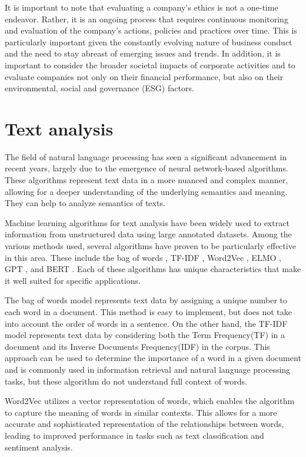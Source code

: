 \documentclass[PI]{ProjectProposal}
\begin{document}
It is important to note that evaluating a company's ethics is not a one-time endeavor. Rather, it is an ongoing process that requires continuous monitoring and evaluation of the company's actions, policies and practices over time. This is particularly important given the constantly evolving nature of business conduct and the need to stay abreast of emerging issues and trends. In addition, it is important to consider the broader societal impacts of corporate activities and to evaluate companies not only on their financial performance, but also on their environmental, social and governance (ESG) factors.
\section{Text analysis}
\label{sec:org01a1cc5}
The field of natural language processing has seen a significant advancement in recent years\autocites{devlin2018bert}[][]{wang2018glue}, largely due to the emergence of neural network-based algorithms. These algorithms represent text data in a more nuanced and complex manner, allowing for a deeper understanding of the underlying semantics and meaning. They can help to analyze semantics of texts.

Machine learning algorithms for text analysis have been widely used to extract information from unstructured data using large annotated datasets. Among the various methods used, several algorithms have proven to be particularly effective in this area. These include the bag of words \autocite{doi:10.1080/00437956.1954.11659520}, TF-IDF \autocite{jones1972statistical}, Word2Vec\autocite{mikolov2013distributed} , ELMO \autocite{elmo}, GPT \autocite{radford2019language}, and BERT \autocite{devlin2018bert}. Each of these algorithms has unique characteristics that make it well suited for specific applications.

The bag of words model represents text data by assigning a unique number to each word in a document. This method is easy to implement, but does not take into account the order of words in a sentence. On the other hand, the TF-IDF model represents text data by considering both the Term Frequency(TF) in a document and its Inverse Documents Frequency(IDF) in the corpus. This approach can be used to determine the importance of a word in a given document and is commonly used in information retrieval and natural language processing tasks, but these algorithm do not understand full context of words.

Word2Vec utilizes a vector representation of words, which enables the algorithm to capture the meaning of words in similar contexts. This allows for a more accurate and sophisticated representation of the relationships between words, leading to improved performance in tasks such as text classification and sentiment analysis.
\end{document}
